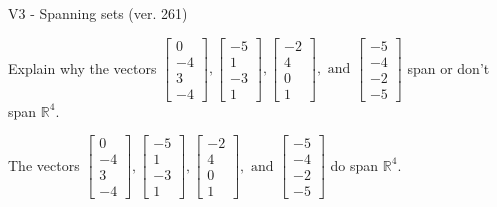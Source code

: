 \begin{exercise}
  \begin{exerciseTitle}V3 - Spanning sets (ver. 261)\end{exerciseTitle}
  \begin{exerciseStatement}
    Explain why the vectors \(\left[\begin{array}{r}
0 \\
-4 \\
3 \\
-4
\end{array}\right] , \left[\begin{array}{r}
-5 \\
1 \\
-3 \\
1
\end{array}\right] , \left[\begin{array}{r}
-2 \\
4 \\
0 \\
1
\end{array}\right] , \text{ and } \left[\begin{array}{r}
-5 \\
-4 \\
-2 \\
-5
\end{array}\right]\) span or don't span \(\mathbb{R}^4\). 
	


  \end{exerciseStatement}
  \begin{exerciseAnswer}
   The vectors \(\left[\begin{array}{r}
0 \\
-4 \\
3 \\
-4
\end{array}\right] , \left[\begin{array}{r}
-5 \\
1 \\
-3 \\
1
\end{array}\right] , \left[\begin{array}{r}
-2 \\
4 \\
0 \\
1
\end{array}\right] , \text{ and } \left[\begin{array}{r}
-5 \\
-4 \\
-2 \\
-5
\end{array}\right]\) 
  	 do  
	span \(\mathbb{R}^4\).
  


  \end{exerciseAnswer}
\end{exercise}